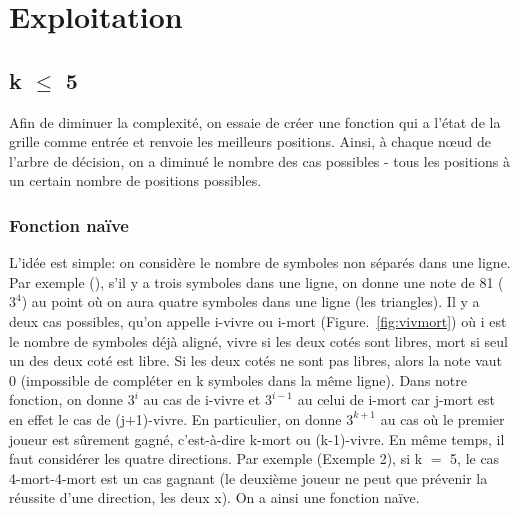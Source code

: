 \documentclass[12pt, a4paper]{article}
\begin{document}
\section{Exploitation}
\subsection{k $\le$ 5}
Afin de diminuer la complexité, on essaie de créer une fonction qui a l'état de la grille comme entrée et renvoie les meilleurs positions. Ainsi, à chaque nœud de l'arbre de décision, on a diminué le nombre des cas possibles - tous les positions à un certain nombre de positions possibles.
\subsubsection{Fonction naïve}
L'idée est simple: on considère le nombre de symboles non séparés dans une ligne. Par exemple (), s'il y a trois symboles dans une ligne, on donne une note de 81 ($3^{4}$) au point où on aura quatre symboles dans une ligne (les triangles).
Il y a deux cas possibles, qu'on appelle i-vivre ou i-mort (\mbox{Figure. \ref{fig:vivmort}}) où i est le nombre de symboles déjà aligné, vivre si les deux cotés sont libres, mort si seul un des deux coté est libre. Si les deux cotés ne sont pas libres, alors la note vaut 0 (impossible de compléter en k symboles dans la même ligne).
Dans notre fonction, on donne $3^{i}$ au cas de i-vivre et $3^{i-1}$ au celui de i-mort car j-mort est en effet le cas de (j$+$1)-vivre. En particulier, on donne $3^{k+1}$ au cas où le premier joueur est sûrement gagné, c'est-à-dire k-mort ou (k-1)-vivre. En même temps, il faut considérer les quatre directions. Par exemple (Exemple 2), si k $=$ 5, le cas 4-mort-4-mort est un cas gagnant (le deuxième joueur ne peut que prévenir la réussite d'une direction, les deux x).
On a ainsi une fonction naïve.
\end{document}
